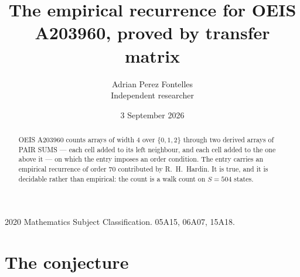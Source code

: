 \documentclass[11pt,a4paper]{article}
\title{The empirical recurrence for OEIS A203960, proved by transfer matrix}
\author{Adrian Perez Fontelles\\ \small Independent researcher}
\date{3 September 2026}
\theoremstyle{plain}
\theoremstyle{definition}
\begin{document}
\maketitle

\begin{abstract}
OEIS A203960 counts arrays of width $4$ over $\{0,1,2\}$ through two derived arrays of PAIR SUMS ---
each cell added to its left neighbour, and each cell added to the one above it --- on which the
entry imposes an order condition. The entry carries an empirical recurrence of order $70$
contributed by R.~H.~Hardin. It is true, and it is decidable rather than empirical: the count is
a walk count on $S=504$ states.
\end{abstract}

\noindent\small 2020 Mathematics Subject Classification. 05A15, 06A07, 15A18.\normalsize

\section{The conjecture}
\end{document}
